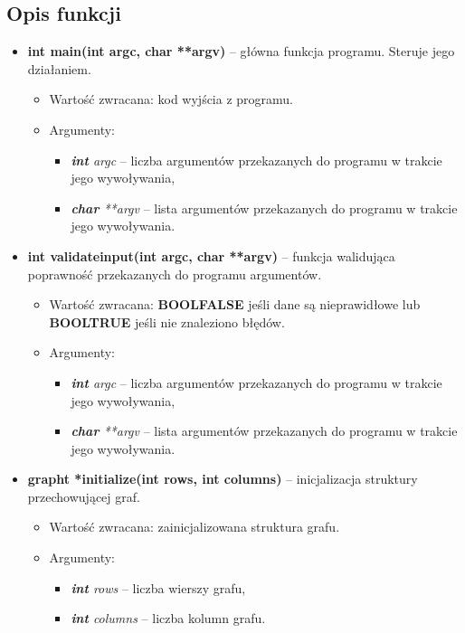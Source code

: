 \documentclass{article}
\begin{document}
\subsection{Opis funkcji}
\begin{itemize}
    \item \textbf{int main(int argc, char **argv)} -- główna funkcja programu. Steruje jego działaniem.
    \begin{itemize}
        \item Wartość zwracana: kod wyjścia z programu.
        \item Argumenty:
            \begin{itemize}
                \item \textit{\textbf{int} argc} -- liczba argumentów przekazanych do programu w trakcie jego wywoływania,
                \item \textit{\textbf{char} **argv} -- lista argumentów przekazanych do programu \linebreak w trakcie jego wywoływania.
            \end{itemize}
    \end{itemize}
    
    \item \textbf{int validate\textunderscore input(int argc, char **argv)} -- funkcja walidująca poprawność przekazanych do programu argumentów.
    \begin{itemize}
        \item Wartość zwracana: \textbf{BOOL\textunderscore FALSE} jeśli dane są nieprawidłowe \linebreak lub \textbf{BOOL\textunderscore TRUE} jeśli nie znaleziono błędów.
        \item Argumenty:
            \begin{itemize}
                \item \textit{\textbf{int} argc} -- liczba argumentów przekazanych do programu w trakcie jego wywoływania,
                \item \textit{\textbf{char} **argv} -- lista argumentów przekazanych do programu \linebreak w trakcie jego wywoływania.
            \end{itemize}
    \end{itemize}
    
    \item \textbf{graph\textunderscore t *initialize(int rows, int columns)} -- inicjalizacja struktury przechowującej graf.
    \begin{itemize}
        \item Wartość zwracana: zainicjalizowana struktura grafu.
        \item Argumenty:
            \begin{itemize}
                \item \textit{\textbf{int} rows} -- liczba wierszy grafu,
                \item \textit{\textbf{int} columns} -- liczba kolumn grafu.
            \end{itemize}
    \end{itemize}
    

\end{itemize}
\end{document}
